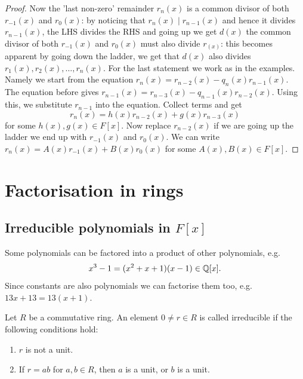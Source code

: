 \documentclass[10pt, a4paper]{article}
\begin{document}
\begin{theorem}
\begin{proof}
        Now the 'last non-zero' remainder $r_n(x)$ is a common divisor of both $r_{-1}(x)$ and $r_0(x)$:
        by noticing that $r_n(x) \mid r_{n - 1}(x)$ and hence it divides $r_{n - 1}(x)$,
        the LHS divides the RHS and going up we get $d(x)$ the common divisor of both $r_{-1}(x)$ and $r_0(x)$ must also divide $r_(x)$:
        this becomes apparent by going down the ladder,
        we get that $d(x)$ also divides $r_1(x), r_2(x), \dotsc, r_n(x)$.
        For the last statement we work as in the examples.
        Namely we start from the equation $r_n(x) = r_{n - 2}(x) - q_n(x)r_{n - 1}(x)$.
        The equation before gives $r_{n - 1}(x) = r_{n - 3}(x) - q_{n - 1}(x)r_{n - 2}(x)$.
        Using this,
        we substitute $r_{n - 1}$ into the equation.
        Collect terms and get
        \[
        r_n(x) = h(x)r_{n - 2}(x) + g(x)r_{n - 3}(x)
        \]
        for some $h(x), g(x) \in F[x]$.
        Now replace $r_{n - 2}(x)$ if we are going up the ladder we end up with $r_{-1}(x)$ and $r_0(x)$.
        We can write $r_n(x) = A(x)r_{-1}(x) + B(x)r_0(x)$ for some $A(x), B(x) \in F[x]$.
    \end{proof}
\end{theorem}

\newpage

\section{Factorisation in rings}

\subsection{Irreducible polynomials in \texorpdfstring{$F[x]$}{}}

Some polynomials can be factored into a product of other polynomials,
e.g.
\[
x ^ 3 - 1 = (x ^ 2 + x + 1)(x - 1) \in \mathbb{Q}[x].
\]
Since constants are also polynomials we can factorise them too,
e.g. $13x + 13 = 13(x + 1)$.

\begin{definition}
    Let $R$ be a commutative ring.
    An element $0 \neq r \in R$ is called irreducible if the following conditions hold:
    \begin{enumerate}[label = \roman*)]
        \item $r$ is not a unit.
        \item If $r = ab$ for $a, b \in R$,
        then $a$ is a unit,
        or $b$ is a unit.
    \end{enumerate}
\end{definition}
\end{document}
